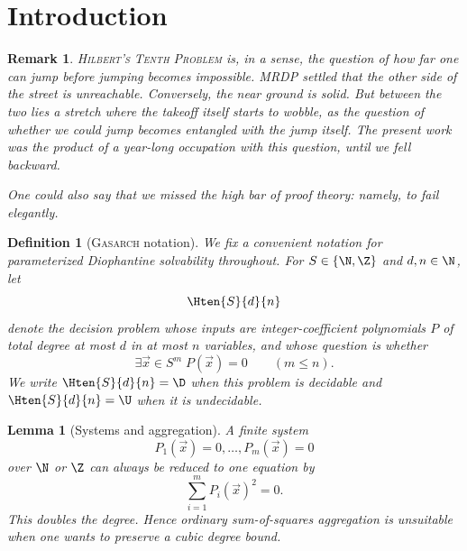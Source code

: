\documentclass[letterpaper,10pt]{article}
\theoremstyle{upright}
\theoremstyle{upright}
\newtheorem{remark}[theorem]{Remark}
\newtheorem{definition}[theorem]{Definition}
\newtheorem{lemma}[theorem]{Lemma}
\begin{document}
\section{Introduction}

\begin{remark}

	\textsc{Hilbert's Tenth Problem} \citep{hilbert1900} is, in a sense, the question of how far one can jump before jumping becomes impossible. \textsc{MRDP} \citep{rdp61,matiyasevich70,davis1973,mrdpbook} settled that the other side of the street is unreachable. Conversely, the near ground is solid. But between the two lies a stretch where the takeoff itself starts to wobble, as the question of whether we could jump becomes entangled with the jump itself. The present work was the product of a year-long occupation with this question, until we fell backward.

	One could also say that we missed the high bar of \emph{proof theory}: namely, to \emph{fail elegantly}.

\end{remark}
\begin{definition}[\textsc{Gasarch} notation]
\label{def:hn-notation}
	We fix a convenient \citep{gasarch21} notation for parameterized Diophantine solvability throughout. For $S\in\{\N,\Z\}$ and $d,n\in\N$, let
	\begin{equation}
		\Hten{S}{d}{n}
	\end{equation}
	denote the decision problem whose inputs are integer-coefficient polynomials $P$ of total degree at most $d$ in at most $n$ variables, and whose question is whether
	\begin{equation}
		\exists \vec{x}\in S^m\; P(\vec{x})=0
		\qquad(m\leq n).
	\end{equation}
	We write $\Hten{S}{d}{n}=\D$ when this problem is decidable and $\Hten{S}{d}{n}=\U$ when it is undecidable.
\end{definition}

\begin{lemma}[Systems and aggregation]
\label{prop:trivial-systems}
	A finite system
	\begin{equation}
		P_1(\vec{x})=0,\ldots,P_m(\vec{x})=0
	\end{equation}
	over $\N$ or $\Z$ can always be reduced to one equation by
	\begin{equation}
		\sum_{i=1}^m P_i(\vec{x})^2=0.
	\end{equation}
	This doubles the degree. Hence ordinary sum-of-squares aggregation is unsuitable when one wants to preserve a cubic degree bound.
\end{lemma}
\end{document}
